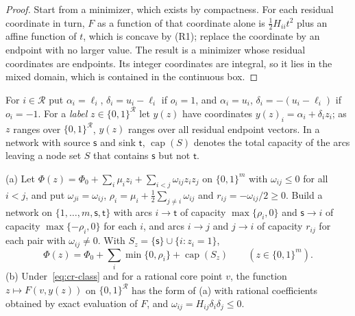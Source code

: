 \begin{proof}
Start from a minimizer, which exists by compactness. For each residual
coordinate in turn, $F$ as a function of that coordinate alone is
$\frac12H_{ii}t^2$ plus an affine function of $t$, which is concave by
(R1); replace the coordinate by an endpoint with no larger value. The
result is a minimizer whose residual coordinates are endpoints. Its integer
coordinates are integral, so it lies in the mixed domain, which is
contained in the continuous box.
\end{proof}

For $i\in\mathcal R$ put $\alpha_i=\ell_i$, $\delta_i=u_i-\ell_i$ if $o_i=1$,
and $\alpha_i=u_i$, $\delta_i=-(u_i-\ell_i)$ if $o_i=-1$. For a
\emph{label} $z\in\{0,1\}^{\mathcal R}$ let $y(z)$ have coordinates
$y(z)_i=\alpha_i+\delta_iz_i$; as $z$ ranges over $\{0,1\}^{\mathcal R}$,
$y(z)$ ranges over all residual endpoint vectors. In a
network with source $\mathsf s$ and sink $\mathsf t$, $\operatorname{cap}(S)$
denotes the total capacity of the arcs leaving a node set $S$ that contains
$\mathsf s$ but not $\mathsf t$.

\begin{proposition}\label{prop:cr-cut}
(a) Let $\Phi(z)=\Phi_0+\sum_i\mu_iz_i+\sum_{i<j}\omega_{ij}z_iz_j$ on
$\{0,1\}^m$ with $\omega_{ij}\le0$ for all $i<j$, and put
$\omega_{ji}=\omega_{ij}$, $\rho_i=\mu_i+\frac12\sum_{j\ne i}\omega_{ij}$ and
$r_{ij}=-\omega_{ij}/2\ge0$. Build a network on $\{1,\dots,m,\mathsf s,\mathsf t\}$
with arcs $i\to\mathsf t$ of capacity $\max\{\rho_i,0\}$ and
$\mathsf s\to i$ of capacity $\max\{-\rho_i,0\}$ for each $i$, and arcs
$i\to j$ and $j\to i$ of capacity $r_{ij}$ for each pair with
$\omega_{ij}\ne0$. With $S_z=\{\mathsf s\}\cup\{i:z_i=1\}$,
\begin{equation}\label{eq:cr-cutid}
\Phi(z)=\Phi_0+\sum_i\min\{0,\rho_i\}+\operatorname{cap}(S_z)
\qquad(z\in\{0,1\}^m).
\end{equation}
(b) Under~\eqref{eq:cr-class} and for a rational core point $v$, the
function $z\mapsto F(v,y(z))$ on $\{0,1\}^{\mathcal R}$ has the form of (a)
with rational coefficients obtained by exact evaluation of $F$, and
$\omega_{ij}=H_{ij}\delta_i\delta_j\le0$.
\end{proposition}

